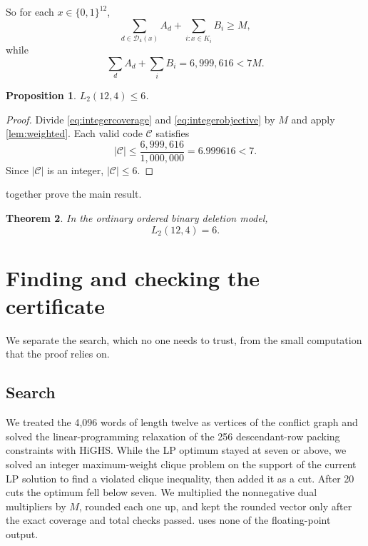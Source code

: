 \documentclass[11pt]{article}
\newtheorem{theorem}{Theorem}[section]
\newtheorem{proposition}[theorem]{Proposition}
\theoremstyle{definition}
\newcommand{\bits}{\{0,1\}}
\newcommand{\D}{\mathcal{D}}
\newcommand{\C}{\mathcal{C}}
\begin{document}
So for each $x\in\bits^{12}$,
\begin{equation}\label{eq:integercoverage}
  \sum_{d\in\D_4(x)}A_d+\sum_{i:x\in K_i}B_i\geq M,
\end{equation}
while
\begin{equation}\label{eq:integerobjective}
  \sum_d A_d+\sum_i B_i=6{,}999{,}616<7M.
\end{equation}

\begin{proposition}\label{prop:upper}
$L_2(12,4)\leq6$.
\end{proposition}

\begin{proof}
Divide \eqref{eq:integercoverage} and \eqref{eq:integerobjective} by $M$ and
apply \cref{lem:weighted}.  Each valid code $\C$ satisfies
\[
  |\C|\leq\frac{6{,}999{,}616}{1{,}000{,}000}=6.999616<7.
\]
Since $|\C|$ is an integer, $|\C|\leq6$.
\end{proof}

 together prove the main result.

\begin{theorem}\label{thm:main}
In the ordinary ordered binary deletion model,
\[
  \boxed{L_2(12,4)=6}.
\]
\end{theorem}

\section{Finding and checking the certificate}

We separate the search, which no one needs to trust, from the small
computation that the proof relies on.

\subsection{Search}

We treated the 4,096 words of length twelve as vertices of the conflict graph
and solved the linear-programming relaxation of the 256 descendant-row packing
constraints with HiGHS.  While the LP optimum stayed at seven or above, we
solved an integer maximum-weight clique problem on the support of the current
LP solution to find a violated clique inequality, then added it as a cut.
After 20 cuts the optimum fell below seven.  We multiplied the nonnegative dual
multipliers by $M$, rounded each one up, and kept the rounded vector only after
the exact coverage and total checks passed.   uses none of the
floating-point output.
\end{document}
